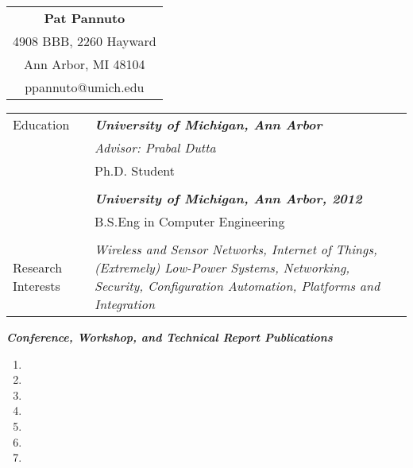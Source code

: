 \documentclass{article}
\begin{document}

\begin{table}
\centering
\begin{tabular}{c}
{\bf Pat Pannuto} \\
4908 BBB, 2260 Hayward \\
Ann Arbor, MI 48104 \\
ppannuto@umich.edu \\
\end{tabular}
\end{table}


\begin{table}
\begin{tabularx}{\linewidth}{p{2cm} X}
{\sc Education} & {\bf {\em University of Michigan, Ann Arbor}} \\
 & {\em Advisor: Prabal Dutta} \\
 & Ph.D. Student \\
 & \\
 & {\bf {\em University of Michigan, Ann Arbor, 2012}} \\
 & B.S.Eng in Computer Engineering \\
 & \\
{\sc Research Interests} & {\em Wireless and Sensor Networks, Internet of
Things, (Extremely) Low-Power Systems, Networking, Security, Configuration
Automation, Platforms and Integration}
\end{tabularx}
\end{table}

{\bf {\em Conference, Workshop, and Technical Report Publications}}

\begin{enumerate}

  \item {}
  \item {}
  \item {}
  \item {}
  \item {}
  \item {}
  \item {}

\end{enumerate}
\end{document}
